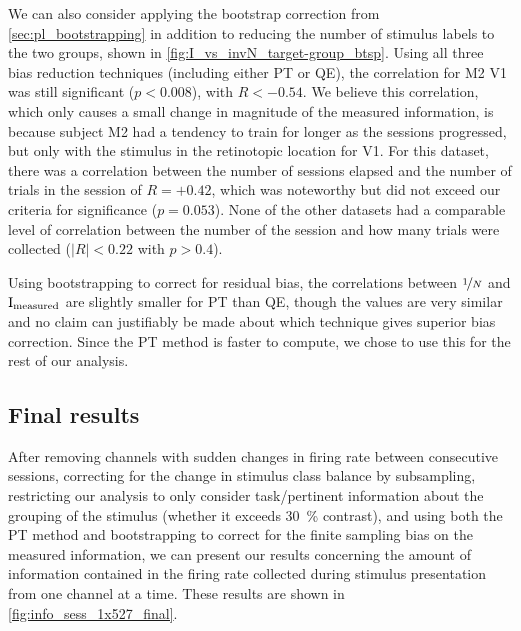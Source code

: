 
We can also consider applying the bootstrap correction from \autoref{sec:pl_bootstrapping} in addition to reducing the number of stimulus labels to the two groups, shown in \autoref{fig:I_vs_invN_target-group_btsp}.
Using all three bias reduction techniques (including either \ac{PT} or \ac{QE}), the correlation for \ac{M2} \ac{V1} was still significant ($p < 0.008$), with $R<-0.54$.
We believe this correlation, which only causes a small change in magnitude of the measured information, is because subject \ac{M2} had a tendency to train for longer as the sessions progressed, but only with the stimulus in the retinotopic location for \ac{V1}.
For this dataset, there was a correlation between the number of sessions elapsed and the number of trials in the session of $R=+0.42$, which was noteworthy but did not exceed our criteria for significance ($p=0.053$).
None of the other datasets had a comparable level of correlation between the number of the session and how many trials were collected ($|R|<0.22$ with $p > 0.4$).

Using bootstrapping to correct for residual bias, the correlations between $\nicefrac{1}{N}$ and $\operatorname{I}_\text{measured}$ are slightly smaller for \ac{PT} than \ac{QE}, though the values are very similar and no claim can justifiably be made about which technique gives superior bias correction.
Since the \ac{PT} method is faster to compute, we chose to use this for the rest of our analysis.


\subsection{Final results}
\label{sec:pl_initial_final}

After removing channels with sudden changes in firing rate between consecutive sessions, correcting for the change in stimulus class balance by subsampling, restricting our analysis to only consider task\-/pertinent information about the grouping of the stimulus (whether it exceeds \SI{30}{\percent} contrast), and using both the \ac{PT} method and bootstrapping to correct for the finite sampling bias on the measured information, we can present our results concerning the amount of information contained in the firing rate collected during stimulus presentation from one channel at a time.
These results are shown in \autoref{fig:info_sess_1x527_final}.

